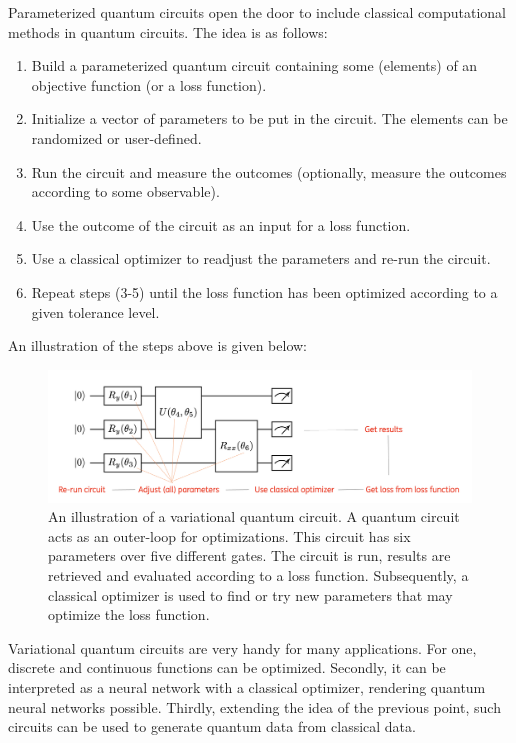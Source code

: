 \documentclass[../main.tex]{subfiles}
\begin{document}
Parameterized quantum circuits open the door to include classical computational methods in quantum circuits. The idea is as follows:
\begin{enumerate}
    \item Build a parameterized quantum circuit containing some (elements) of an objective function (or a loss function).
    \item Initialize a vector of parameters to be put in the circuit. The elements can be randomized or user-defined.
    \item Run the circuit and measure the outcomes (optionally, measure the outcomes according to some observable).
    \item Use the outcome of the circuit as an input for a loss function.
    \item Use a classical optimizer to readjust the parameters and re-run the circuit.
    \item Repeat steps (3-5) until the loss function has been optimized according to a given tolerance level.
\end{enumerate}

An illustration of the steps above is given below:

\begin{figure}[H]
    \begin{center}
      \includegraphics[width=1\linewidth]{../../images/variational_circuit_example.png}
    \end{center}
    \caption{An illustration of a variational quantum circuit. A quantum circuit acts as an outer-loop for optimizations. This circuit has six parameters over five different gates. The circuit is run, results are retrieved and evaluated according to a loss function. Subsequently, a classical optimizer is used to find or try new parameters that may optimize the loss function.}
    \label{fig: variational_circuit_example}
  \end{figure}

Variational quantum circuits are very handy for many applications. For one, discrete and continuous functions can be optimized. Secondly, it can be interpreted as a neural network with a classical optimizer, rendering quantum neural networks possible. Thirdly, extending the idea of the previous point, such circuits can be used to generate quantum data from classical data. 

\biblio
\end{document}
